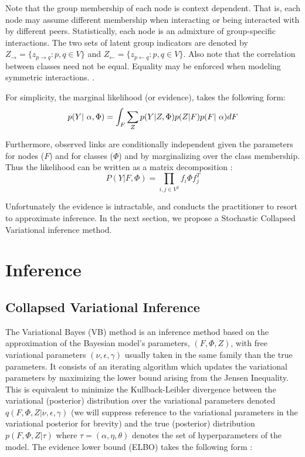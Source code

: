 Note that the group membership of each node is context dependent. That is, each node may assume different membership when interacting or being interacted with by different peers. Statistically, each node is an admixture of group-specific interactions. The two sets of latent group indicators are denoted by $Z_\rightarrow = \{z_{p\rightarrow q} : p, q \in V\}$ and $Z_\leftarrow = \{z_{p\leftarrow q} : p, q \in V\}$. Also note that the correlation between classes need not be equal. Equality may be enforced when modeling symmetric interactions. \cite{goldenberg2010survey}.


For simplicity, the marginal likelihood (or evidence), takes the following form:
\begin{equation}
    \p(Y | \alpha, \Phi) = \int_F \sum_Z \p(Y| Z, \Phi) \p(Z|F) \p(F| \alpha) dF
\end{equation}

Furthermore, observed links are conditionally independent given the parameters for nodes ($F$) and for classes ($\Phi$) and by marginalizing over the class membership. Thus the likelihood can be written as a matrix decomposition :
\begin{equation}
P(Y | F, \Phi) = \prod_{i,j \in V^2} f_i \Phi f_j^T
\end{equation} 

Unfortunately the evidence is intractable, and conducts the practitioner to resort to approximate inference. In the next section, we propose a Stochastic Collapsed Variational inference method.

\section{Inference}


\subsection{Collapsed Variational Inference}

The Variational Bayes (VB) method is an inference method based on the approximation of the Bayesian model's parameters, $(F, \Phi, Z)$, with free variational parameters $(\nu, \epsilon, \gamma)$ usually taken in the same family than the true parameters. It consists of an iterating algorithm which updates the variational parameters by maximizing the lower bound arising from the Jensen Inequality. This is equivalent to  minimize the Kullback-Leibler divergence between the variational (posterior) distribution over the variational parameters denoted $q(F, \Phi, Z | \nu, \epsilon, \gamma)$ (we will suppress reference to the variational parameters in the variational posterior for brevity) and the true (posterior) distribution $p(F, \Phi, Z | \tau)$ where $\tau = (\alpha, \eta, \theta)$ denotes the set of hyperparameters of the model. The evidence lower bound (ELBO) takes the following form :

